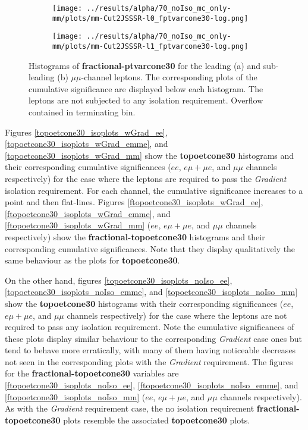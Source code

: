 \begin{figure}
\centering
\begin{subfigure}{.65\textwidth}
  \centering
  \texttt{[image: ../results/alpha/70\_noIso\_mc\_only-mm/plots/mm-Cut2JSSSR-l0\_fptvarcone30-log.png]}
  \caption{}
  \label{mm_leading_topoetcone}
\end{subfigure}
\begin{subfigure}{.65\textwidth}
 \centering
  \texttt{[image: ../results/alpha/70\_noIso\_mc\_only-mm/plots/mm-Cut2JSSSR-l1\_fptvarcone30-log.png]}
  \caption{}
  \label{mm_subleading_topoetcone}
\end{subfigure}
\caption{Histograms of \textbf{fractional-ptvarcone30} for the leading (a) and sub-leading (b) $\mu\mu$-channel leptons. The corresponding plots of the cumulative significance are displayed below each histogram.  The leptons are not subjected to any isolation requirement. Overflow contained in terminating bin.}
\label{fptvarcone30_isoplots_noIso_mm}
\end{figure}
Figures \ref{topoetcone30_isoplots_wGrad_ee}, \ref{topoetcone30_isoplots_wGrad_emme}, and \ref{topoetcone30_isoplots_wGrad_mm} show the \textbf{topoetcone30} histograms and their corresponding cumulative significances ($ee$, $e \mu + \mu e$, and $\mu\mu$ channels respectively) for the case where the leptons are required to pass the \textit{Gradient} isolation requirement. For each channel, the cumulative significance increases to a point and then flat-lines. Figures \ref{ftopoetcone30_isoplots_wGrad_ee}, \ref{ftopoetcone30_isoplots_wGrad_emme}, and \ref{ftopoetcone30_isoplots_wGrad_mm} ($ee$, $e \mu + \mu e$, and $\mu\mu$ channels respectively) show the \textbf{fractional-topoetcone30} histograms and their corresponding cumulative significances. Note that they display qualitatively the same behaviour as the plots for \textbf{topoetcone30}.

On the other hand, figures \ref{topoetcone30_isoplots_noIso_ee}, \ref{topoetcone30_isoplots_noIso_emme}, and \ref{topoetcone30_isoplots_noIso_mm} show the \textbf{topoetcone30} histograms with their corresponding significances ($ee$, $e \mu + \mu e$, and $\mu\mu$ channels respectively) for the case where the leptons are not required to pass any isolation requirement. Note the cumulative significances of these plots display similar behaviour to the corresponding \textit{Gradient} case ones but tend to behave more erratically, with many of them having noticeable decreases not seen in the corresponding plots with the \textit{Gradient} requirement. The figures for the \textbf{fractional-topoetcone30} variables are \ref{ftopoetcone30_isoplots_noIso_ee}, \ref{ftopoetcone30_isoplots_noIso_emme}, and \ref{ftopoetcone30_isoplots_noIso_mm} ($ee$, $e \mu + \mu e$, and $\mu\mu$ channels respectively). As with the \textit{Gradient} requirement case, the no isolation requirement \textbf{fractional-topoetcone30} plots resemble the associated \textbf{topoetcone30} plots.


